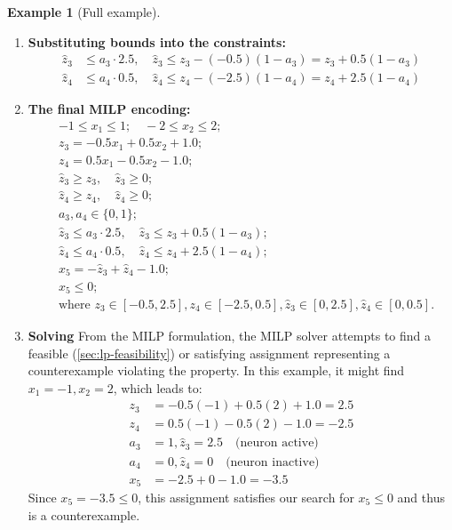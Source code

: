 \documentclass[oneside,11pt,dvipsnames]{book}
\numberwithin{equation}{section}
\theoremstyle{definition}
\newtheorem{example}{Example}[section]
\theoremstyle{remark}
\newcommand{\tvn}[1]{\iftoggle{usecomment}{{\color{red}{[TVN]: #1}}}{}}
\begin{document}
\begin{example}[Full example]
\begin{enumerate}
So we set $l_3 = -0.5, u_3 = 2.5$, and $l_4 = -2.5, u_4 = 0.5$.

\item \textbf{Substituting bounds into the constraints:}
\begin{align*}
\hat{z}_3 &\le a_3 \cdot 2.5, \quad \hat{z}_3 \le z_3 - (-0.5)(1 - a_3) = z_3 + 0.5(1 - a_3) \\
\hat{z}_4 &\le a_4 \cdot 0.5, \quad \hat{z}_4 \le z_4 - (-2.5)(1 - a_4) = z_4 + 2.5(1 - a_4)
\end{align*}

\item \textbf{The final MILP encoding:}
\begin{align*}
& -1 \le x_1 \le 1; \quad -2 \le x_2 \le 2; \\
& z_3 = -0.5x_1 + 0.5x_2 + 1.0; \\
& z_4 = 0.5x_1 - 0.5x_2 - 1.0; \\
& \hat{z}_3 \ge z_3, \quad \hat{z}_3 \ge 0; \\
& \hat{z}_4 \ge z_4, \quad \hat{z}_4 \ge 0; \\
& a_3, a_4 \in \{0, 1\}; \\
& \hat{z}_3 \le a_3 \cdot 2.5, \quad \hat{z}_3 \le z_3 + 0.5(1 - a_3); \\
& \hat{z}_4 \le a_4 \cdot 0.5, \quad \hat{z}_4 \le z_4 + 2.5(1 - a_4); \\
& x_5 = -\hat{z}_3 + \hat{z}_4 - 1.0; \\
& x_5 \le 0; \\
& \text{where } z_3 \in [-0.5, 2.5], z_4 \in [-2.5, 0.5], \hat{z}_3 \in [0, 2.5], \hat{z}_4 \in [0, 0.5].
\end{align*}


\item \textbf{Solving} From the MILP formulation, the MILP solver attempts to find a feasible (\autoref{sec:lp-feasibility}) or satisfying assignment representing a counterexample violating the property.  In this example, it might find $x_1 = -1, x_2 = 2$, which leads to:
\begin{align*}
z_3 &= -0.5(-1) + 0.5(2) + 1.0 = 2.5 \\
z_4 &= 0.5(-1) - 0.5(2) - 1.0 = -2.5 \\
a_3 &= 1, \hat{z}_3 = 2.5 \quad \text{(neuron active)} \\
a_4 &= 0, \hat{z}_4 = 0 \quad \text{(neuron inactive)} \\
x_5 &= -2.5 + 0 - 1.0 = -3.5
\end{align*}
Since $x_5 = -3.5 \le 0$, this assignment satisfies our search for $x_5 \le 0$ and  thus is a counterexample.
\end{enumerate}
\end{example}
\end{document}
